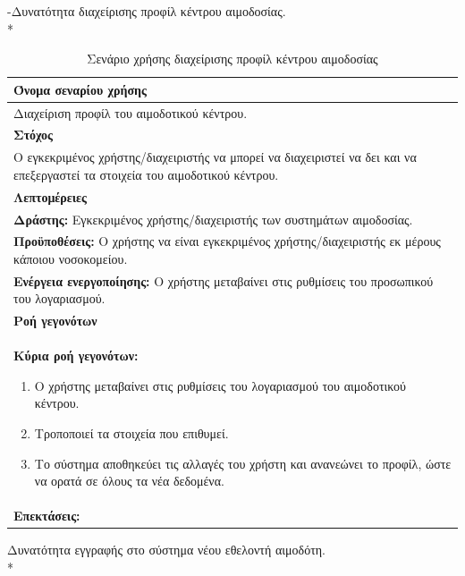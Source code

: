 -Δυνατότητα διαχείρισης προφίλ κέντρου αιμοδοσίας.
\\*

\begin{table}[H]
	\begin{center}
	    \begin{tabular}{|p{\dimexpr \linewidth-2\tabcolsep}|}
	    \hline
	    \rowcolor{grayy}
	    \textbf{Όνομα σεναρίου χρήσης}
	    \\ \hline    
	    Διαχείριση προφίλ του αιμοδοτικού κέντρου. 
	     \\ \hline
	    \rowcolor{grayy}
	    \textbf{\textbf{Στόχος}}
	    \\ \hline
	 	 Ο εγκεκριμένος χρήστης/διαχειριστής να μπορεί να διαχειριστεί να δει και να επεξεργαστεί τα στοιχεία του αιμοδοτικού κέντρου.
	    \\ \hline
	    \rowcolor{grayy}
	    \textbf{Λεπτομέρειες}
	    \\ \hline
		\textbf{Δράστης:} Εγκεκριμένος χρήστης/διαχειριστής των συστημάτων αιμοδοσίας.
		\\*
		\textbf{Προϋποθέσεις:} Ο χρήστης να είναι εγκεκριμένος χρήστης/διαχειριστής εκ μέρους κάποιου νοσοκομείου.
		\\*
		\textbf{Ενέργεια ενεργοποίησης:} Ο χρήστης μεταβαίνει στις ρυθμίσεις του προσωπικού του λογαριασμού.
		\\ \hline
		\rowcolor{grayy}    
	    \textbf{Ροή γεγονότων}
	    \\ \hline
		\textbf{Κύρια ροή γεγονότων:}
		\begin{enumerate}
			\item	 Ο χρήστης μεταβαίνει στις ρυθμίσεις του λογαριασμού του αιμοδοτικού κέντρου.
			\item Τροποποιεί τα στοιχεία που επιθυμεί.
			\item Το σύστημα αποθηκεύει τις αλλαγές του χρήστη και ανανεώνει το προφίλ, ώστε να ορατά σε όλους τα νέα δεδομένα.
		\end{enumerate}
		\\ \hline
		\textbf{Επεκτάσεις:}
		   \\ \hline
	    \end{tabular}
	    \caption{Σενάριο χρήσης διαχείρισης προφίλ κέντρου αιμοδοσίας}
	    \label{tab:blood_center_account_management}
	\end{center}
\end{table}	

Δυνατότητα εγγραφής στο σύστημα νέου εθελοντή αιμοδότη.
\\*	

